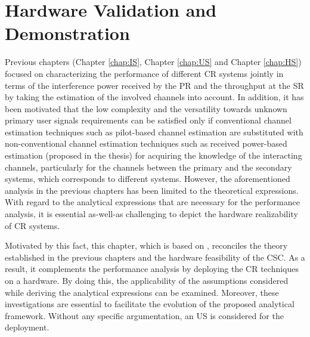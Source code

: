 \chapter{Hardware Validation and Demonstration}
\label{chap:HVD}

Previous chapters (Chapter \ref{chap:IS}, Chapter \ref{chap:US} and Chapter \ref{chap:HS}) focused on characterizing the performance of different CR systems jointly in terms of the interference power received by the PR and the throughput at the SR by taking the estimation of the involved channels into account. In addition, it has been motivated that the low complexity and the versatility towards unknown primary user signals requirements can be satisfied only if conventional channel estimation techniques such as pilot-based channel estimation are substituted with non-conventional channel estimation techniques such as received power-based estimation (proposed in the thesis) for acquiring the knowledge of the interacting channels, particularly for the channels between the primary and the secondary systems, which corresponds to different systems. However, the aforementioned analysis in the previous chapters has been limited to the theoretical expressions. With regard to the analytical expressions that are necessary for the performance analysis, it is essential as-well-as challenging to depict the hardware realizability of CR systems. 

Motivated by this fact, this chapter, which is based on , reconciles the theory established in the previous chapters and the hardware feasibility of the CSC. As a result, it complements the performance analysis by deploying the CR techniques on a hardware. By doing this, the applicability of the assumptions considered while deriving the analytical expressions can be examined. Moreover, these investigations are essential to facilitate the evolution of the proposed analytical framework. Without any specific argumentation, an US is considered for the deployment.    

